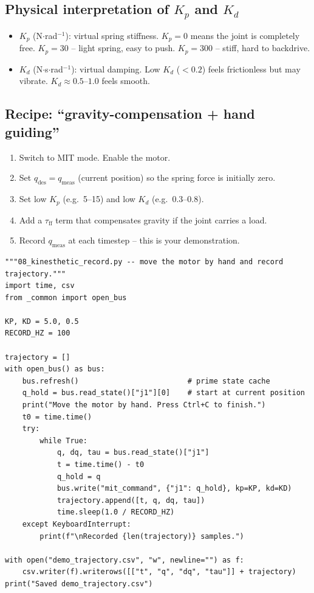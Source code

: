 \documentclass[11pt,a4paper]{article}
\begin{document}
\subsection{Physical interpretation of $K_p$ and $K_d$}
\begin{itemize}
  \item $K_p$ (N$\cdot$rad$^{-1}$): virtual spring stiffness.  $K_p = 0$
        means the joint is completely free.
        $K_p = 30$ -- light spring, easy to push.
        $K_p = 300$ -- stiff, hard to backdrive.
  \item $K_d$ (N$\cdot$s$\cdot$rad$^{-1}$): virtual damping.  Low $K_d$
        ($< 0.2$) feels frictionless but may vibrate.
        $K_d \approx 0.5$--$1.0$ feels smooth.
\end{itemize}

\subsection{Recipe: ``gravity-compensation + hand guiding''}

\begin{enumerate}
  \item Switch to MIT mode.  Enable the motor.
  \item Set $q_{\text{des}}=q_{\text{meas}}$ (current position) so the spring
        force is initially zero.
  \item Set low $K_p$ (e.g.\ 5--15) and low $K_d$ (e.g.\ 0.3--0.8).
  \item Add a $\tau_{\text{ff}}$ term that compensates gravity if the joint
        carries a load.
  \item Record $q_{\text{meas}}$ at each timestep -- this is your demonstration.
\end{enumerate}

\begin{lstlisting}
"""08_kinesthetic_record.py -- move the motor by hand and record trajectory."""
import time, csv
from _common import open_bus

KP, KD = 5.0, 0.5
RECORD_HZ = 100

trajectory = []
with open_bus() as bus:
    bus.refresh()                         # prime state cache
    q_hold = bus.read_state()["j1"][0]    # start at current position
    print("Move the motor by hand. Press Ctrl+C to finish.")
    t0 = time.time()
    try:
        while True:
            q, dq, tau = bus.read_state()["j1"]
            t = time.time() - t0
            q_hold = q
            bus.write("mit_command", {"j1": q_hold}, kp=KP, kd=KD)
            trajectory.append([t, q, dq, tau])
            time.sleep(1.0 / RECORD_HZ)
    except KeyboardInterrupt:
        print(f"\nRecorded {len(trajectory)} samples.")

with open("demo_trajectory.csv", "w", newline="") as f:
    csv.writer(f).writerows([["t", "q", "dq", "tau"]] + trajectory)
print("Saved demo_trajectory.csv")
\end{lstlisting}
\end{document}
